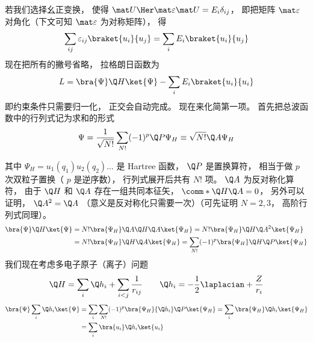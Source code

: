 若我们选择幺正变换， 使得 ${\mat U\Her }\mat \varepsilon \mat U = {E_i}{\delta_{ij}}$， %
即把矩阵 $\mat \varepsilon$ 对角化（下文可知 $\mat\varepsilon$ 为对称矩阵）， 得
\begin{equation}
\sum_{ij} \varepsilon_{ij} \braket{u_i}{u_j}
= \sum_i {E_i}  \braket{u_i}{u_j}
\end{equation}
现在把所有的撇号省略， 拉格朗日函数为
\begin{equation}
L =\bra{\Psi}\Q H \ket{\Psi}  - \sum_i E_i \braket{u_i}{u_i}
\end{equation}
即约束条件只需要归一化， 正交会自动完成。 现在来化简第一项。 首先把总波函数中的行列式记为求和的形式
\begin{equation}
\Psi  = \frac{1}{\sqrt {N!}} \sum_{N!} (-1)^p \Q P{\Psi_H}  \equiv \sqrt{N!} \Q A \Psi_H
\end{equation}

其中 $\Psi_H = u_1(q_1) u_2(q_2)\dots$ 是 Hartree 函数，  $\Q P$ 是置换算符， 相当于做 $p$ 次双粒子置换（ $p$ 是逆序数）， 行列式展开后共有 $N!$ 项。  $\Q A$ 为反对称化算符， 由于 $\Q H$ 和 $\Q A$ 存在一组共同本征矢， $\comm*{\Q H}{\Q A} = 0$，  另外可以证明， $\Q A^2 = \Q A$ （意义是反对称化只需要一次）（可先证明 $N = 2,3$，  高阶行列式同理）。
\begin{equation}
\begin{aligned}
\bra{\Psi}\Q H\ket{\Psi}  &= N!\bra{\Psi_H} \Q A\Q H\Q A \ket{\Psi_H} = N!\bra{\Psi_H}\Q H \Q A^2\ket{\Psi_H} \\
&= N!\bra{\Psi_H} \Q H\Q A\ket{\Psi_H}   = \sum_{N!} (-1)^p \bra{\Psi_H}\Q H\Q P\ket{\Psi_H}\\ 
\end{aligned}
\end{equation}
我们现在考虑多电子原子（离子）问题
\begin{equation}
\Q H = \sum_i \Q h_i + \sum_{i < j} \frac{1}{r_{ij}} \qquad
\Q h_i =  - \frac12 \laplacian + \frac{Z}{r_i}
\end{equation}
\begin{equation}
\begin{aligned}
\bra{\Psi}\sum_i \Q h_i \ket{\Psi} & = \sum_i \sum_{N!} ( - 1)^p \bra{\Psi_H}{\Q h_i}\Q P \ket{\Psi_H} = \sum_i \bra{\Psi_H} \Q h_i \ket{\Psi_H}\\
&= \sum_i \bra{u_i} \Q h_i \ket{u_i}
\end{aligned}
\end{equation}
 
